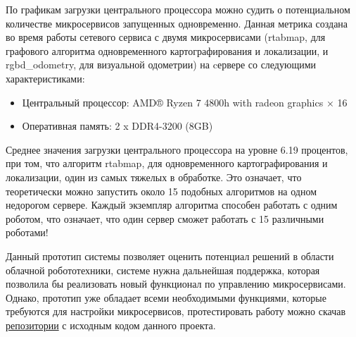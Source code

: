 \documentclass[a4paper, 14pt]{extreport}
\begin{document}
\par По графикам загрузки центрального процессора можно судить о потенциальном количестве микросервисов запущенных одновременно. 
Данная метрика создана во время работы сетевого сервиса с двумя микросервисами (rtabmap, для графового алгоритма одновременного
картографирования и локализации, и rgbd\_odometry, для визуальной одометрии) на cервере со следующими характеристиками:
\begin{itemize}
        \item Центральный процессор: AMD® Ryzen 7 4800h with radeon graphics × 16
        \item Оперативная память: 2 x DDR4-3200 (8GB)
\end{itemize}
\par Среднее значения загрузки центрального процессора на уровне 6.19 процентов, при том, что алгоритм rtabmap, для одновременного картографирования и локализации, 
один из самых тяжелых в обработке. Это означает, что теоретически можно запустить около 15 подобных алгоритмов на одном недорогом сервере. Каждый экземпляр 
алгоритма способен работать с одним роботом, что означает, что один сервер сможет работать с 15 различными роботами! 
\par Данный прототип системы позволяет оценить потенциал решений в области облачной робототехники, системе нужна дальнейшая поддержка, которая позволила
бы реализовать новый функционал по управлению микросервисами.
Однако, прототип уже обладает всеми необходимыми функциями, которые требуются для настройки микросервисов,
протестировать работу можно скачав \href{https://github.com/sees1/masters}{репозитории} с исходным 
кодом данного проекта.
\end{document}
